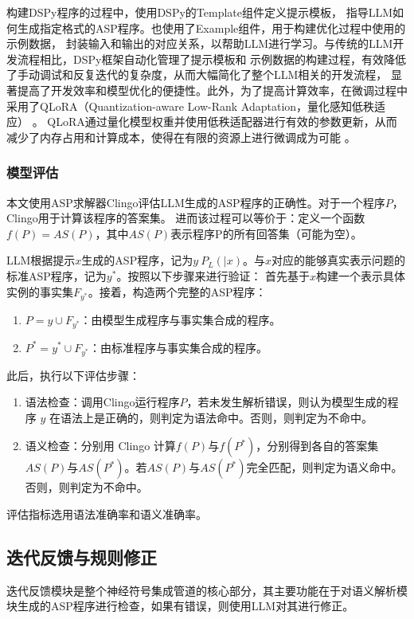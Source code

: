 构建DSPy程序的过程中，使用DSPy的Template组件定义提示模板，
指导LLM如何生成指定格式的ASP程序。也使用了Example组件，用于构建优化过程中使用的示例数据，
封装输入和输出的对应关系，以帮助LLM进行学习。与传统的LLM开发流程相比，DSPy框架自动化管理了提示模板和
示例数据的构建过程，有效降低了手动调试和反复迭代的复杂度，从而大幅简化了整个LLM相关的开发流程，
显著提高了开发效率和模型优化的便捷性。此外，为了提高计算效率，在微调过程中采用了QLoRA（Quantization-aware Low-Rank Adaptation，量化感知低秩适应） 。
QLoRA通过量化模型权重并使用低秩适配器进行有效的参数更新，从而减少了内存占用和计算成本，使得在有限的资源上进行微调成为可能 。
\subsubsection{模型评估}
本文使用ASP求解器Clingo评估LLM生成的ASP程序的正确性。对于一个程序$P$，Clingo用于计算该程序的答案集。
进而该过程可以等价于：定义一个函数$f(P) = AS(P)$，其中$AS(P)$表示程序P的所有回答集（可能为空）。

LLM根据提示$x$生成的ASP程序，记为$y ~ P_L(|x)$。与$x$对应的能够真实表示问题的标准ASP程序，记为$y^*$。按照以下步骤来进行验证：
首先基于$x$构建一个表示具体实例的事实集$F_{y^*}$。接着，构造两个完整的ASP程序：
\begin{enumerate}[itemsep=0pt,parsep=0pt]
\item $P = y \cup F_{y^*}$：由模型生成程序与事实集合成的程序。
\item $P^* = y^* \cup F_{y^*}$：由标准程序与事实集合成的程序。
\end{enumerate}

此后，执行以下评估步骤：
\begin{enumerate}
\item 语法检查：调用Clingo运行程序$P$，若未发生解析错误，则认为模型生成的程序 $y$ 在语法上是正确的，则判定为语法命中。否则，则判定为不命中。
\item 语义检查：分别用 Clingo 计算$f(P)$与$f(P^*)$，分别得到各自的答案集$AS(P)$与$AS(P^*)$。若$AS(P)$与$AS(P^*)$完全匹配，则判定为语义命中。
否则，则判定为不命中。
\end{enumerate}

评估指标选用语法准确率和语义准确率。
\subsection{迭代反馈与规则修正}
迭代反馈模块是整个神经符号集成管道的核心部分，其主要功能在于对语义解析模块生成的ASP程序进行检查，如果有错误，则使用LLM对其进行修正。
